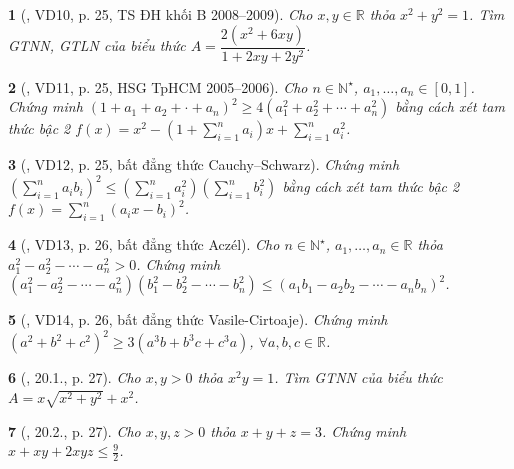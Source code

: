 \documentclass{article}
\newtheorem{baitoan}{}
\begin{document}
\begin{baitoan}[\cite{Hai_Hung_Thu_Tung_ncpt_Toan_10_tap_2}, VD10, p. 25, TS ĐH khối B 2008--2009]
	Cho $x,y\in\mathbb{R}$ thỏa $x^2 + y^2 = 1$. Tìm {\rm GTNN, GTLN} của biểu thức $A = \dfrac{2(x^2 + 6xy)}{1 + 2xy + 2y^2}$.
\end{baitoan}

\begin{baitoan}[\cite{Hai_Hung_Thu_Tung_ncpt_Toan_10_tap_2}, VD11, p. 25, HSG TpHCM 2005--2006]
	Cho $n\in\mathbb{N}^\star$, $a_1,\ldots,a_n\in[0,1]$. Chứng minh $(1 + a_1 + a_2 + \cdot + a_n)^2\ge4(a_1^2 + a_2^2 + \cdots + a_n^2)$ bằng cách xét tam thức bậc 2 $f(x) = x^2 - \left(1 + \sum_{i=1}^n a_i\right)x + \sum_{i=1}^n a_i^2$.
\end{baitoan}

\begin{baitoan}[\cite{Hai_Hung_Thu_Tung_ncpt_Toan_10_tap_2}, VD12, p. 25, bất đẳng thức Cauchy--Schwarz]
	Chứng minh $\left(\sum_{i=1}^n a_ib_i\right)^2\le\left(\sum_{i=1}^n a_i^2\right)\left(\sum_{i=1}^n b_i^2\right)$ bằng cách xét tam thức bậc 2 $f(x) = \sum_{i=1}^n (a_ix - b_i)^2$.
\end{baitoan}

\begin{baitoan}[\cite{Hai_Hung_Thu_Tung_ncpt_Toan_10_tap_2}, VD13, p. 26, bất đẳng thức Acz\'el]
	Cho $n\in\mathbb{N}^\star$, $a_1,\ldots,a_n\in\mathbb{R}$ thỏa $a_1^2 - a_2^2 - \cdots - a_n^2 > 0$. Chứng minh $(a_1^2 - a_2^2 - \cdots - a_n^2)(b_1^2 - b_2^2 - \cdots - b_n^2)\le(a_1b_1 - a_2b_2 - \cdots - a_nb_n)^2$.
\end{baitoan}

\begin{baitoan}[\cite{Hai_Hung_Thu_Tung_ncpt_Toan_10_tap_2}, VD14, p. 26, bất đẳng thức Vasile-Cirtoaje]
	Chứng minh $(a^2 + b^2 + c^2)^2\ge3(a^3b + b^3c + c^3a)$, $\forall a,b,c\in\mathbb{R}$.
\end{baitoan}

\begin{baitoan}[\cite{Hai_Hung_Thu_Tung_ncpt_Toan_10_tap_2}, 20.1., p. 27]
	Cho $x,y > 0$ thỏa $x^2y = 1$. Tìm {\rm GTNN} của biểu thức $A = x\sqrt{x^2 + y^2} + x^2$.
\end{baitoan}

\begin{baitoan}[\cite{Hai_Hung_Thu_Tung_ncpt_Toan_10_tap_2}, 20.2., p. 27]
	Cho $x,y,z > 0$ thỏa $x + y + z = 3$. Chứng minh $x + xy + 2xyz\le\frac{9}{2}$.
\end{baitoan}
\end{document}
